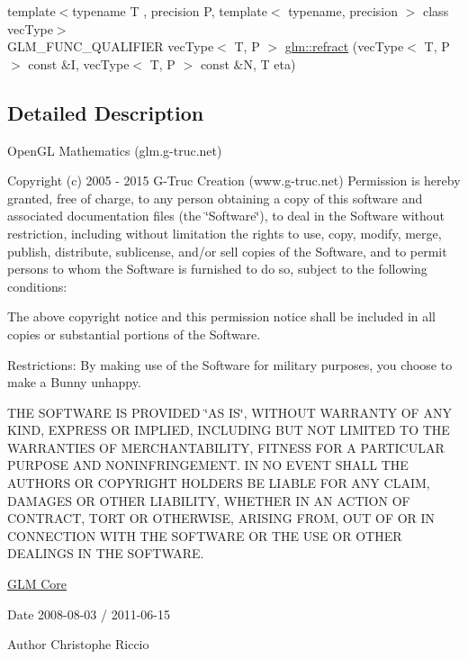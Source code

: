 \begin{DoxyCompactItemize}
\item 
{\footnotesize template$<$typename T , precision P, template$<$ typename, precision $>$ class vec\-Type$>$ }\\G\-L\-M\-\_\-\-F\-U\-N\-C\-\_\-\-Q\-U\-A\-L\-I\-F\-I\-E\-R vec\-Type$<$ T, P $>$ \hyperlink{group__core__func__geometric_gab7e7cdf4403931a5f7b74560ad64159b}{glm\-::refract} (vec\-Type$<$ T, P $>$ const \&I, vec\-Type$<$ T, P $>$ const \&N, T eta)
\end{DoxyCompactItemize}


\subsection{Detailed Description}
Open\-G\-L Mathematics (glm.\-g-\/truc.\-net)

Copyright (c) 2005 -\/ 2015 G-\/\-Truc Creation (www.\-g-\/truc.\-net) Permission is hereby granted, free of charge, to any person obtaining a copy of this software and associated documentation files (the \char`\"{}\-Software\char`\"{}), to deal in the Software without restriction, including without limitation the rights to use, copy, modify, merge, publish, distribute, sublicense, and/or sell copies of the Software, and to permit persons to whom the Software is furnished to do so, subject to the following conditions\-:

The above copyright notice and this permission notice shall be included in all copies or substantial portions of the Software.

Restrictions\-: By making use of the Software for military purposes, you choose to make a Bunny unhappy.

T\-H\-E S\-O\-F\-T\-W\-A\-R\-E I\-S P\-R\-O\-V\-I\-D\-E\-D \char`\"{}\-A\-S I\-S\char`\"{}, W\-I\-T\-H\-O\-U\-T W\-A\-R\-R\-A\-N\-T\-Y O\-F A\-N\-Y K\-I\-N\-D, E\-X\-P\-R\-E\-S\-S O\-R I\-M\-P\-L\-I\-E\-D, I\-N\-C\-L\-U\-D\-I\-N\-G B\-U\-T N\-O\-T L\-I\-M\-I\-T\-E\-D T\-O T\-H\-E W\-A\-R\-R\-A\-N\-T\-I\-E\-S O\-F M\-E\-R\-C\-H\-A\-N\-T\-A\-B\-I\-L\-I\-T\-Y, F\-I\-T\-N\-E\-S\-S F\-O\-R A P\-A\-R\-T\-I\-C\-U\-L\-A\-R P\-U\-R\-P\-O\-S\-E A\-N\-D N\-O\-N\-I\-N\-F\-R\-I\-N\-G\-E\-M\-E\-N\-T. I\-N N\-O E\-V\-E\-N\-T S\-H\-A\-L\-L T\-H\-E A\-U\-T\-H\-O\-R\-S O\-R C\-O\-P\-Y\-R\-I\-G\-H\-T H\-O\-L\-D\-E\-R\-S B\-E L\-I\-A\-B\-L\-E F\-O\-R A\-N\-Y C\-L\-A\-I\-M, D\-A\-M\-A\-G\-E\-S O\-R O\-T\-H\-E\-R L\-I\-A\-B\-I\-L\-I\-T\-Y, W\-H\-E\-T\-H\-E\-R I\-N A\-N A\-C\-T\-I\-O\-N O\-F C\-O\-N\-T\-R\-A\-C\-T, T\-O\-R\-T O\-R O\-T\-H\-E\-R\-W\-I\-S\-E, A\-R\-I\-S\-I\-N\-G F\-R\-O\-M, O\-U\-T O\-F O\-R I\-N C\-O\-N\-N\-E\-C\-T\-I\-O\-N W\-I\-T\-H T\-H\-E S\-O\-F\-T\-W\-A\-R\-E O\-R T\-H\-E U\-S\-E O\-R O\-T\-H\-E\-R D\-E\-A\-L\-I\-N\-G\-S I\-N T\-H\-E S\-O\-F\-T\-W\-A\-R\-E.

\hyperlink{group__core}{G\-L\-M Core}

\begin{DoxyDate}{Date}
2008-\/08-\/03 / 2011-\/06-\/15 
\end{DoxyDate}
\begin{DoxyAuthor}{Author}
Christophe Riccio 
\end{DoxyAuthor}
